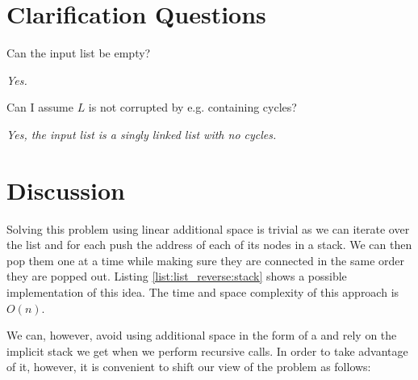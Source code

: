 \section{Clarification Questions}

\begin{QandA}
	\begin{questionitem} \begin{question} Can the input list be empty?   \end{question} 	 
    \begin{answered}
		\textit{Yes.}
	\end{answered} \end{questionitem}

	\begin{questionitem} \begin{question} Can I assume $L$ is not corrupted by e.g. containing cycles?   \end{question} 	 
    \begin{answered}
		\textit{Yes, the input list is a singly linked list with no cycles.}
	\end{answered} \end{questionitem}
	
\end{QandA}

\section{Discussion}
\label{list_reverse:sec:discussion}
Solving this problem using linear additional space is trivial as we can iterate over the list
and for each push the address of each of its nodes in a stack. We can then pop them one at a time
while making sure they are connected in the same order they are popped out. Listing
\ref{list:list_reverse:stack} shows a possible implementation of this idea. The time and space
complexity of this approach is $O(n)$.



We can,  however,  avoid using additional space in the form of a  and rely on the
implicit stack we get when we perform recursive calls. In order to take advantage of it, however, it is 
convenient to shift our view of the problem as follows:

